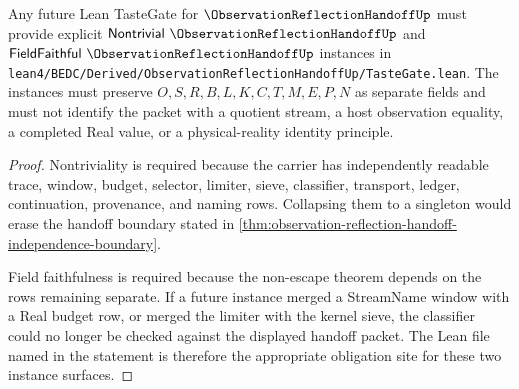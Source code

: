 \begin{theorem}
\label{thm:observation-reflection-handoff-tastegate-obligation}
Any future Lean TasteGate for $\ObservationReflectionHandoffUp$ must provide explicit $\mathsf{Nontrivial}\ \ObservationReflectionHandoffUp$ and $\mathsf{FieldFaithful}\ \ObservationReflectionHandoffUp$ instances in \texttt{lean4/BEDC/Derived/ObservationReflectionHandoffUp/TasteGate.lean}. The instances must preserve $O,S,R,B,L,K,C,T,M,E,P,N$ as separate fields and must not identify the packet with a quotient stream, a host observation equality, a completed Real value, or a physical-reality identity principle.
\end{theorem}
\begin{proof}
Nontriviality is required because the carrier has independently readable trace, window, budget, selector, limiter, sieve, classifier, transport, ledger, continuation, provenance, and naming rows. Collapsing them to a singleton would erase the handoff boundary stated in \autoref{thm:observation-reflection-handoff-independence-boundary}.

Field faithfulness is required because the non-escape theorem depends on the rows remaining separate. If a future instance merged a StreamName window with a Real budget row, or merged the limiter with the kernel sieve, the classifier could no longer be checked against the displayed handoff packet. The Lean file named in the statement is therefore the appropriate obligation site for these two instance surfaces.
\end{proof}




